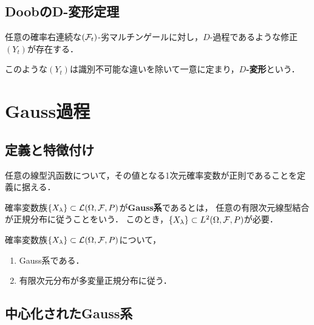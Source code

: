 \documentclass[uplatex,dvipdfmx]{jsreport}
\begin{document}
\subsection{DoobのD-変形定理}

\begin{theorem}
    任意の確率右連続な$(\mathcal{F}_t)$-劣マルチンゲールに対し，$D$-過程であるような修正$(Y_t)$が存在する．
\end{theorem}

\begin{definition}
    このような$(Y_t)$は識別不可能な違いを除いて一意に定まり，\textbf{$D$-変形}という．
\end{definition}

\section{Gauss過程}

\subsection{定義と特徴付け}

\begin{tcolorbox}[colframe=ForestGreen, colback=ForestGreen!10!white,breakable,colbacktitle=ForestGreen!40!white,coltitle=black,fonttitle=\bfseries\sffamily,
title=]
    任意の線型汎函数について，その値となる1次元確率変数が正則であることを定義に据える．
\end{tcolorbox}

\begin{definition}
    確率変数族$\{X_\lambda\}\subset\mathcal{L}(\Omega,\mathcal{F},P)$が\textbf{Gauss系}であるとは，
    任意の有限次元線型結合が正規分布に従うことをいう．
    このとき，$\{X_\lambda\}\subset L^2(\Omega,\mathcal{F},P)$が必要．
\end{definition}

\begin{theorem}
    確率変数族$\{X_\lambda\}\subset\mathcal{L}(\Omega,\mathcal{F},P)$について，
    \begin{enumerate}
        \item Gauss系である．
        \item 有限次元分布が多変量正規分布に従う．
    \end{enumerate}
\end{theorem}

\subsection{中心化されたGauss系}
\end{document}
